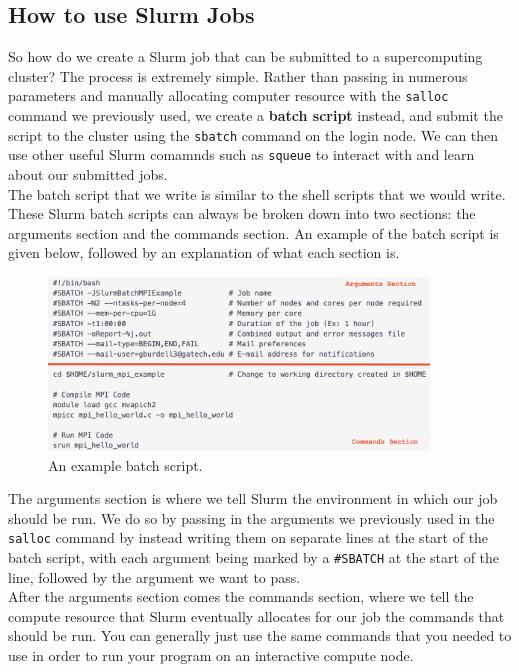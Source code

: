 \documentclass{article}
\begin{document}
\subsection{How to use Slurm Jobs}

So how do we create a Slurm job that can be submitted to a supercomputing cluster? The process is extremely simple. Rather than passing in numerous parameters and manually allocating computer resource with the \texttt{salloc} command we previously used, we create a \textbf{batch script} instead, and submit the script to the cluster using the \texttt{sbatch} command on the login node. We can then use other useful Slurm comamnds such as \texttt{squeue} to interact with and learn about our submitted jobs. \\

\noindent The batch script that we write is similar to the shell scripts that we would write. These Slurm batch scripts can always be broken down into two sections: the arguments section and the commands section. An example of the batch script is given below, followed by an explanation of what each section is. 

\begin{figure}[H]
    \centering
    \includegraphics[width=0.9\textwidth]{img/Screenshot 2025-09-07 at 21.59.40.png}
    \caption{An example batch script.}
\end{figure}

\noindent The arguments section is where we tell Slurm the environment in which our job should be run. We do so by passing in the arguments we previously used in the \texttt{salloc} command by instead writing them on separate lines at the start of the batch script, with each argument being marked by a \texttt{\#SBATCH} at the start of the line, followed by the argument we want to pass. \\ 

\noindent After the arguments section comes the commands section, where we tell the compute resource that Slurm eventually allocates for our job the commands that should be run. You can generally just use the same commands that you needed to use in order to run your program on an interactive compute node.
\end{document}
